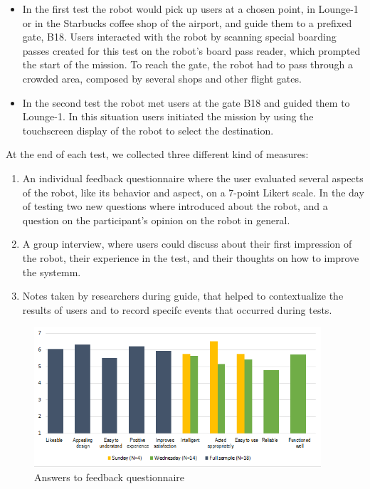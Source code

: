 \begin{itemize} 
\item In the first test the robot would pick up users at a chosen point, in Lounge-1 or in the Starbucks coffee shop of the airport, and guide them to a prefixed gate, B18. Users interacted with the robot by scanning special boarding passes created for this test on the robot's board pass reader, which prompted the start of the mission. To reach the gate, the robot had to pass through a crowded area, composed by several shops and other flight gates.
\item In the second test the robot met users at the gate B18 and guided them to Lounge-1. In this situation users initiated the mission by using the touchscreen display of the robot to select the destination.
\end{itemize}

At the end of each test, we collected three different kind of measures:
\begin{enumerate}
\item An individual feedback questionnaire where the user evaluated several aspects of the robot, like its behavior and aspect, on a 7-point Likert scale. In the day of testing two new questions where introduced about the robot, and a question on the participant's opinion on the robot in general.
\item A group interview, where users could discuss about their first impression of the robot, their experience in the test, and their thoughts on how to improve the systemm.
\item  Notes taken by researchers during guide, that helped to contextualize the results of users and to record specifc events that occurred during tests.
\end{enumerate}


\begin{figure}[tb]
  \begin{center}
  \includegraphics[width=0.95\textwidth]{img/case_study/spencer/graph_subjective_questions.png}
  \end{center}
  \caption{Answers to feedback questionnaire}
  \label{fig:feedback_questionnaire}
\end{figure}


